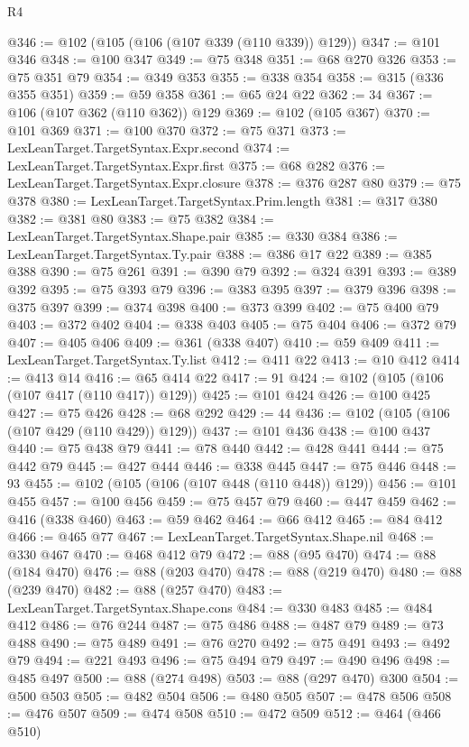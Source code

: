 \begin{lexlean}{R4}
\begin{coremodule}
@346 := @102 (@105 (@106 (@107 @339 (@110 @339)) @129))
@347 := @101 @346
@348 := @100 @347
@349 := @75 @348
@351 := @68 @270 @326
@353 := @75 @351 @79
@354 := @349 @353
@355 := @338 @354
@358 := @315 (@336 @355 @351)
@359 := @59 @358
@361 := @65 @24 @22
@362 := 34
@367 := @106 (@107 @362 (@110 @362)) @129
@369 := @102 (@105 @367)
@370 := @101 @369
@371 := @100 @370
@372 := @75 @371
@373 := LexLeanTarget.TargetSyntax.Expr.second
@374 := LexLeanTarget.TargetSyntax.Expr.first
@375 := @68 @282
@376 := LexLeanTarget.TargetSyntax.Expr.closure
@378 := @376 @287 @80
@379 := @75 @378
@380 := LexLeanTarget.TargetSyntax.Prim.length
@381 := @317 @380
@382 := @381 @80
@383 := @75 @382
@384 := LexLeanTarget.TargetSyntax.Shape.pair
@385 := @330 @384
@386 := LexLeanTarget.TargetSyntax.Ty.pair
@388 := @386 @17 @22
@389 := @385 @388
@390 := @75 @261
@391 := @390 @79
@392 := @324 @391
@393 := @389 @392
@395 := @75 @393 @79
@396 := @383 @395
@397 := @379 @396
@398 := @375 @397
@399 := @374 @398
@400 := @373 @399
@402 := @75 @400 @79
@403 := @372 @402
@404 := @338 @403
@405 := @75 @404
@406 := @372 @79
@407 := @405 @406
@409 := @361 (@338 @407)
@410 := @59 @409
@411 := LexLeanTarget.TargetSyntax.Ty.list
@412 := @411 @22
@413 := @10 @412
@414 := @413 @14
@416 := @65 @414 @22
@417 := 91
@424 := @102 (@105 (@106 (@107 @417 (@110 @417)) @129))
@425 := @101 @424
@426 := @100 @425
@427 := @75 @426
@428 := @68 @292
@429 := 44
@436 := @102 (@105 (@106 (@107 @429 (@110 @429)) @129))
@437 := @101 @436
@438 := @100 @437
@440 := @75 @438 @79
@441 := @78 @440
@442 := @428 @441
@444 := @75 @442 @79
@445 := @427 @444
@446 := @338 @445
@447 := @75 @446
@448 := 93
@455 := @102 (@105 (@106 (@107 @448 (@110 @448)) @129))
@456 := @101 @455
@457 := @100 @456
@459 := @75 @457 @79
@460 := @447 @459
@462 := @416 (@338 @460)
@463 := @59 @462
@464 := @66 @412
@465 := @84 @412
@466 := @465 @77
@467 := LexLeanTarget.TargetSyntax.Shape.nil
@468 := @330 @467
@470 := @468 @412 @79
@472 := @88 (@95 @470)
@474 := @88 (@184 @470)
@476 := @88 (@203 @470)
@478 := @88 (@219 @470)
@480 := @88 (@239 @470)
@482 := @88 (@257 @470)
@483 := LexLeanTarget.TargetSyntax.Shape.cons
@484 := @330 @483
@485 := @484 @412
@486 := @76 @244
@487 := @75 @486
@488 := @487 @79
@489 := @73 @488
@490 := @75 @489
@491 := @76 @270
@492 := @75 @491
@493 := @492 @79
@494 := @221 @493
@496 := @75 @494 @79
@497 := @490 @496
@498 := @485 @497
@500 := @88 (@274 @498)
@503 := @88 (@297 @470) @300
@504 := @500 @503
@505 := @482 @504
@506 := @480 @505
@507 := @478 @506
@508 := @476 @507
@509 := @474 @508
@510 := @472 @509
@512 := @464 (@466 @510)

\end{coremodule}
\end{lexlean}
